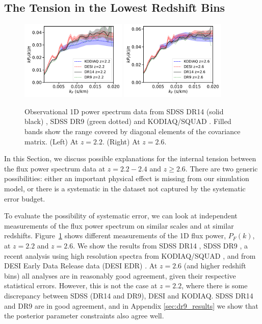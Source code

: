 \subsection{The Tension in the Lowest Redshift Bins}
\label{sec:tension}

\begin{figure}
    \centering
    \includegraphics[width=0.45\textwidth]{figures/lymandata-z2.2.pdf}
    \includegraphics[width=0.45\textwidth]{figures/lymandata-z2.6.pdf}
    \caption{\label{fig:p1d_data}
    Observational 1D power spectrum data from SDSS DR14 (solid black) \protect\cite{2019JCAP...07..017C}, SDSS DR9 (green dotted) \protect\cite{2013A&A...559A..85P} and KODIAQ/SQUAD \protect\cite{2022MNRAS.509.2842K}.
    Filled bands show the range covered by diagonal elements of the covariance matrix.
    (Left) At $z=2.2$.
    (Right) At $z=2.6$.}
\end{figure}

In this Section, we discuss possible explanations for the internal tension between the flux power spectrum data at $z=2.2 - 2.4$ and $z \geq 2.6$.
There are two generic possibilities: either an important physical effect is missing from our simulation model, or there is a systematic in the dataset not captured by the systematic error budget. 

To evaluate the possibility of systematic error, we can look at independent measurements of the flux power spectrum on similar scales and at similar redshifts.
Figure~\ref{fig:p1d_data} shows different measurements of the 1D flux power, $P_F(k)$, at $z=2.2$ and $z=2.6$.
We show the results from SDSS DR14 \cite{2019JCAP...07..017C}, SDSS DR9 \cite{2013A&A...559A..85P}, a recent analysis using high resolution spectra from KODIAQ/SQUAD \cite{2022MNRAS.509.2842K}, and from DESI Early Data Release data (DESI EDR) \cite{2023arXiv230606316G}.
At $z=2.6$ (and higher redshift bins) all analyses are in reasonably good agreement, given their respective statistical errors.
However, this is not the case at $z=2.2$, where there is some discrepancy between SDSS (DR14 and DR9), DESI and KODIAQ.
SDSS DR14 and DR9 are in good agreement, and in Appendix \ref{sec:dr9_results} we show that the posterior parameter constraints also agree well. 

